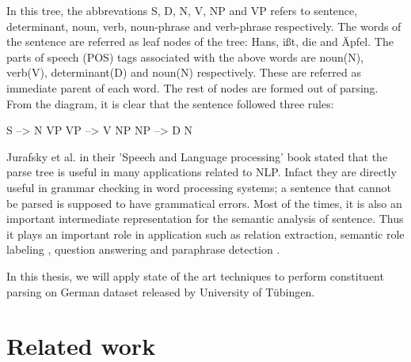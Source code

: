 \documentclass[a4paper, 11pt]{article}
\begin{document}
In this tree, the abbrevations S, D, N, V, NP and VP refers to sentence, determinant, noun, verb, noun-phrase and verb-phrase respectively. The words of the sentence are referred as leaf nodes of the tree: Hans, ißt, die and Äpfel. The parts of speech (POS) tags associated with the above words are noun(N), verb(V), determinant(D) and noun(N) respectively. These are referred as immediate parent of each word. The rest of nodes are formed out of parsing. From the diagram, it is clear that the sentence followed three rules:

S --> N VP \newline
VP --> V NP \newline
NP --> D N 

Jurafsky et al. \parencite{Jurafsky2008} in their 'Speech and Language processing' book stated that the parse tree is useful in many applications related to NLP. Infact they are directly useful in grammar checking in word processing systems; a sentence that cannot be parsed is supposed to have grammatical errors. Most of the times, it is also an important intermediate representation for the semantic analysis of sentence. Thus it plays an important role in application such as relation extraction, semantic role labeling \parencite{Gildea:2002:NPP:1073083.1073124}, question answering and paraphrase detection \parencite{Callison-Burch2010}.


In this thesis, we will apply state of the art techniques to perform constituent parsing on German dataset released by University of Tübingen.

\section{Related work}

\end{document}
